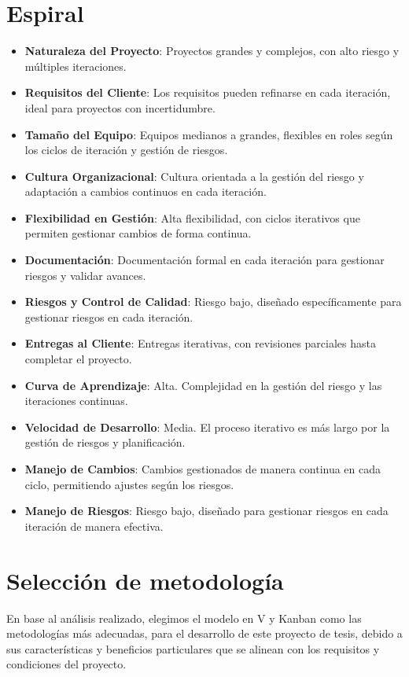 \section{Espiral}
\begin{itemize}
    \item \textbf{Naturaleza del Proyecto}: Proyectos grandes y complejos, con alto riesgo y múltiples iteraciones.
    \item \textbf{Requisitos del Cliente}: Los requisitos pueden refinarse en cada iteración, ideal para proyectos con incertidumbre.
    \item \textbf{Tamaño del Equipo}: Equipos medianos a grandes, flexibles en roles según los ciclos de iteración y gestión de riesgos.
    \item \textbf{Cultura Organizacional}: Cultura orientada a la gestión del riesgo y adaptación a cambios continuos en cada iteración.
    \item \textbf{Flexibilidad en Gestión}: Alta flexibilidad, con ciclos iterativos que permiten gestionar cambios de forma continua.
    \item \textbf{Documentación}: Documentación formal en cada iteración para gestionar riesgos y validar avances.
    \item \textbf{Riesgos y Control de Calidad}: Riesgo bajo, diseñado específicamente para gestionar riesgos en cada iteración.
    \item \textbf{Entregas al Cliente}: Entregas iterativas, con revisiones parciales hasta completar el proyecto.
    \item \textbf{Curva de Aprendizaje}: Alta. Complejidad en la gestión del riesgo y las iteraciones continuas.
    \item \textbf{Velocidad de Desarrollo}: Media. El proceso iterativo es más largo por la gestión de riesgos y planificación.
    \item \textbf{Manejo de Cambios}: Cambios gestionados de manera continua en cada ciclo, permitiendo ajustes según los riesgos.
    \item \textbf{Manejo de Riesgos}: Riesgo bajo, diseñado para gestionar riesgos en cada iteración de manera efectiva.
\end{itemize}


\section{Selección de metodología}

En base al análisis realizado, elegimos el modelo en V y Kanban como las metodologías más adecuadas, para el desarrollo de este proyecto de tesis, debido a sus características y beneficios particulares que se alinean con los requisitos y condiciones del proyecto.


